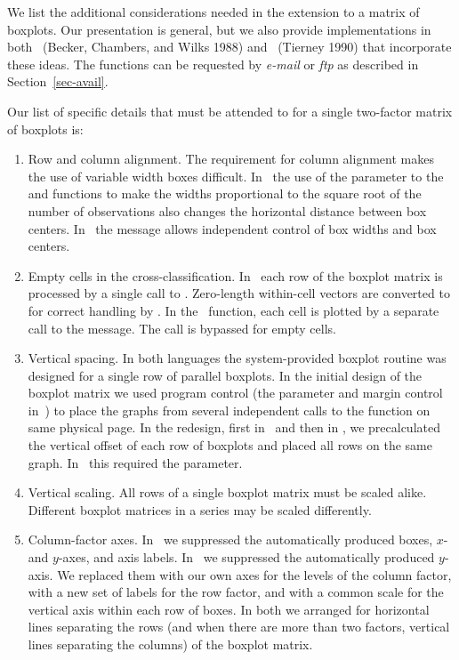 We list the additional considerations needed in the extension to
a matrix of boxplots.  Our presentation is general, but we also
provide implementations in both \iS\ (Becker, Chambers, and Wilks
1988) and \iX\ (Tierney 1990) that incorporate these ideas.  The
functions can be requested by {\it e-mail} or {\it ftp} as
described in Section~\ref{sec-avail}.

Our list of specific details that must be attended to for a
single two-factor matrix of boxplots is:

\begin{enumerate}
\item Row and column alignment.  The requirement for column
    alignment makes the use of variable width boxes difficult.
    In \iS\ the use of the  parameter to the
     and  functions to make the widths
    proportional to the square root of the number of observations
    also changes the horizontal distance between box centers.  In
    \iX\ the  message allows independent control
    of box widths and box centers.

\item Empty cells in the cross-classification.	In \iS\ each row
    of the boxplot matrix is processed by a single call to
    .  Zero-length within-cell vectors are converted
    to  for correct handling by .  In the \iX\
    function, each cell is plotted by a separate call to the
     message.  The call is bypassed for empty
    cells.

\item Vertical spacing.  In both languages the system-provided
    boxplot routine was designed for a single row of parallel
    boxplots.  In the initial design of the boxplot matrix we
    used program control (the  parameter and margin
    control in \iS\,) to place the graphs from several independent
    calls to the \s{boxplot} function on same physical page.  In
    the redesign, first in \iX\ and then in \iS, we
    precalculated the vertical offset of each row of boxplots and
    placed all rows on the same graph.	In \iS\ this required the
    \s{new=T} parameter.

\item Vertical scaling.  All rows of a single boxplot matrix must
    be scaled alike.  Different boxplot matrices in a series may
    be scaled differently.

\item Column-factor axes.  In \iS\ we suppressed the
    automatically produced boxes, $x$- and $y$-axes, and axis
    labels.  In \iX\ we suppressed the automatically produced
    $y$-axis.  We replaced them with our own axes for the levels
    of the column factor, with a new set of labels for the row
    factor, and with a common scale for the vertical axis within
    each row of boxes.	In both we arranged for horizontal lines
    separating the rows (and when there are more than two
    factors, vertical lines separating the columns) of the boxplot
    matrix.


\end{enumerate}
